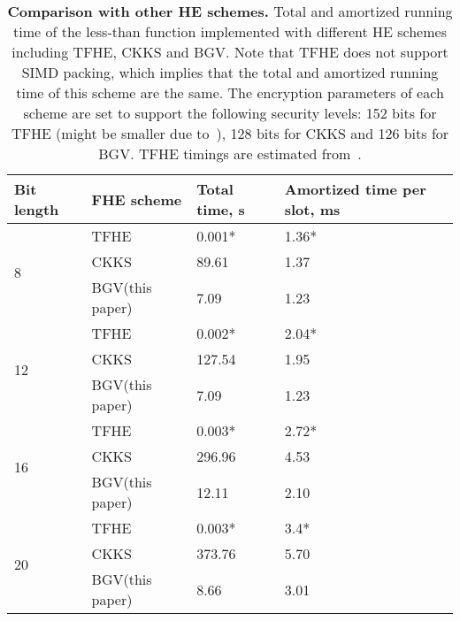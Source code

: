     \begin{table}[h]
      \centering
      \begin{tabular*}{.45\textwidth}{ p{1.2cm} p{2.1cm} p{1.0cm} p{2cm}}
        \toprule
        Bit length  & FHE scheme & Total time, s    & Amortized time per slot, ms \\
        \midrule
        \multirow{3}{*}{8}  & TFHE              & 0.001*     & 1.36* \\
                            & CKKS              & 89.61     & 1.37 \\
                            & BGV(this paper)   & 7.09      & 1.23 \\
        \midrule
        \multirow{3}{*}{12}  & TFHE             & 0.002*     & 2.04* \\
                             & CKKS             & 127.54    & 1.95 \\
                             & BGV(this paper)  & 7.09      & 1.23 \\
        \midrule
        \multirow{3}{*}{16}  & TFHE            & 0.003*     & 2.72* \\
                             & CKKS            & 296.96     & 4.53 \\
                             & BGV(this paper)  & 12.11      & 2.10 \\
        \midrule
        \multirow{3}{*}{20}  & TFHE            & 0.003*      & 3.4* \\
                             & CKKS            & 373.76     & 5.70 \\
                             & BGV(this paper)   & 8.66     &  3.01\\ 
        \bottomrule
      \end{tabular*}
      \caption{\textbf{Comparison with other HE schemes.} Total and amortized running time of the less-than function implemented with different HE schemes including TFHE, CKKS and BGV. Note that TFHE does not support SIMD packing, which implies that the total and amortized running time of this scheme are the same. The encryption parameters of each scheme are set to support the following security levels: 152 bits for TFHE (might be smaller due to~\cite{EPRINT:EJK20}), 128 bits for CKKS and 126 bits for BGV.
      \newline *TFHE timings are estimated from~\cite{JC:CGGI20}.}
      \label{table:other_he_schemes}
    \end{table}
    
